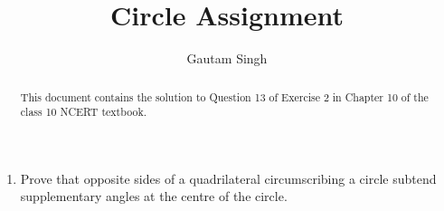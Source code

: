 \documentclass[journal,12pt,twocolumn]{IEEEtran}
\begin{document}
\vspace{3cm}
\title{Circle Assignment}
\author{Gautam Singh}
\maketitle
\bigskip

\begin{abstract}
    This document contains the solution to Question 13 of 
    Exercise 2 in Chapter 10 of the class 10 NCERT textbook.
\end{abstract}

\begin{enumerate}
    \item Prove that opposite sides of a quadrilateral circumscribing a circle 
    subtend supplementary angles at the centre of the circle.


\end{enumerate}
\end{document}
